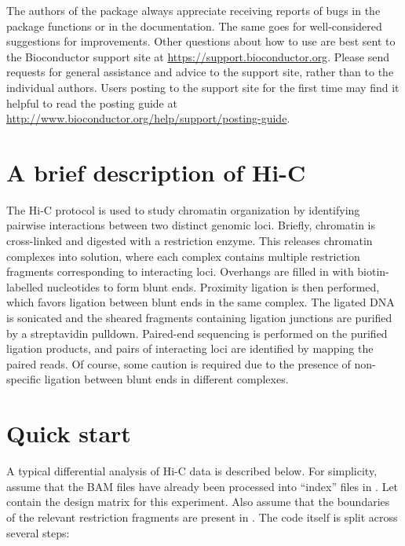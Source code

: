 \documentclass{report}\usepackage[]{graphicx}\usepackage[usenames,dvipsnames]{color}
\begin{document}
The authors of the package always appreciate receiving reports of bugs in the package functions or in the documentation. 
The same goes for well-considered suggestions for improvements. 
Other questions about how to use  are best sent to the Bioconductor support site at \url{https://support.bioconductor.org}.
Please send requests for general assistance and advice to the support site, rather than to the individual authors. 
Users posting to the support site for the first time may find it helpful to read the posting guide at \url{http://www.bioconductor.org/help/support/posting-guide}.

\section{A brief description of Hi-C}
The Hi-C protocol \cite{lieberman2009comprehensive} is used to study chromatin organization by identifying pairwise interactions between two distinct genomic loci.
Briefly, chromatin is cross-linked and digested with a restriction enzyme.
This releases chromatin complexes into solution, where each complex contains multiple restriction fragments corresponding to interacting loci.
Overhangs are filled in with biotin-labelled nucleotides to form blunt ends.
Proximity ligation is then performed, which favors ligation between blunt ends in the same complex.
The ligated DNA is sonicated and the sheared fragments containing ligation junctions are purified by a streptavidin pulldown.
Paired-end sequencing is performed on the purified ligation products, and pairs of interacting loci are identified by mapping the paired reads.
Of course, some caution is required due to the presence of non-specific ligation between blunt ends in different complexes.

\section{Quick start}
A typical differential analysis of Hi-C data is described below.
For simplicity, assume that the BAM files have already been processed into ``index'' files in .
Let  contain the design matrix for this experiment.
Also assume that the boundaries of the relevant restriction fragments are present in .
The code itself is split across several steps: 



\end{document}

